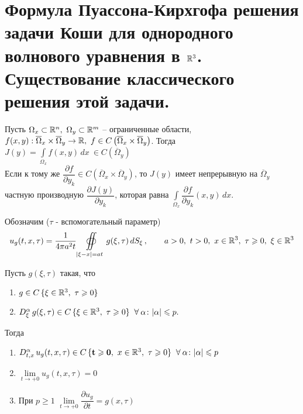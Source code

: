 \documentclass[../main.tex]{subfiles}
\begin{document}
\section[Однородное волновое уравнение в \texorpdfstring{$\R^3$}{R\textasciicircum 3}]{Формула Пуассона-Кирхгофа решения задачи Коши для однородного волнового уравнения в $\R^3$. Существование классического решения этой задачи.}
\begin{theorem}
Пусть $\Omega_x\subset\R^n,\ \Omega_y\subset\R^m$ -- ограниченные области, $f(x,y):\overline{\Omega}_x\times\overline{\Omega}_y\rightarrow \mathbb{R},\ f\in C\left(\overline{\Omega}_x\times\overline{\Omega}_y \right)$. Тогда $J(y)=\displaystyle\int\limits_{\Omega_x}f(x,y)\, dx\ \in C\left(\overline{\Omega}_y \right)$\\
Если к тому же $\dfrac{\partial f}{\partial y_k}\in C\left(\overline{\Omega}_x\times\overline{\Omega}_y \right)$, то $J(y)$ имеет непрерывную на $\overline{\Omega}_y$ частную производную $\dfrac{\partial J(y)}{\partial y_k}$, которая равна $\displaystyle\int\limits_{\Omega_x}\dfrac{\partial f}{\partial y_k}(x,y)\, dx.$
\end{theorem}
Обозначим ($\tau$ - вспомогательный параметр)
\[
u_g(t,x,\tau)=\frac{1}{4\pi a^2t}\displaystyle\oiint\limits_{|\xi - x|=at}g(\xi ,\tau )\, dS_{\xi}\, , \qquad a>0,\ t> 0,\ x\in \R^3,\ \tau \geq 0,\ \xi\in\R^3
\]
\begin{lemma}
\label{lem:5:continuity}
Пусть $g(\xi, \tau )$ такая, что 
\begin{enumerate}
\item $g \in C\,\{\xi\in\mathbb{R}^3,\ \tau\geqslant 0 \}$
\item $D_{\xi}^{\alpha}\, g(\xi , \tau )\in C\,\{\xi\in\mathbb{R}^3,\ \tau\geqslant 0 \} \;\;\forall\:\alpha\colon |\alpha |\leqslant p.$
\end{enumerate}
Тогда
\begin{enumerate}
\item $D_{t,x}^{\alpha}\, u_g(t,x,\tau )\in C\,\{\mathbf{t\geqslant 0},\ x\in\mathbb{R}^3,\ \tau\geqslant 0 \} \;\;\forall\:\alpha\colon |\alpha |\leqslant p$
\item $\lim\limits_{t\rightarrow +0}u_g(t,x,\tau )=0$
\item При $p\geq 1$ $\lim\limits_{t\rightarrow +0}\dfrac{\partial u_g}{\partial t}=g(x,\tau)$
\end{enumerate}
\end{lemma}
\end{document}
